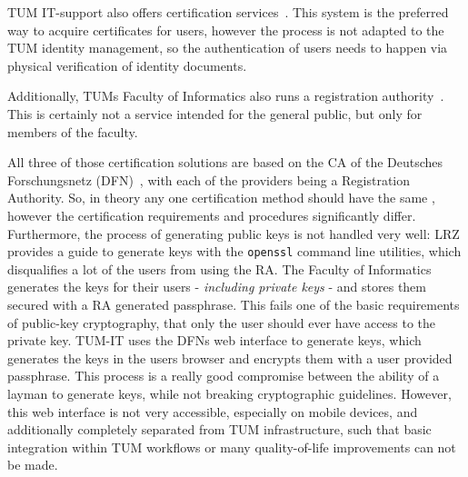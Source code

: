 TUM IT-support also offers certification services~\cite{tumZertifikat}.
This system is the preferred way to acquire certificates for users, however the process is not adapted to the TUM
identity management, so the authentication of users needs to happen via physical verification of identity documents.

Additionally, TUMs Faculty of Informatics also runs a registration authority~\cite{inTumCertificates}.
This is certainly not a service intended for the general public, but only for members of the faculty.

All three of those certification solutions are based on the CA of the Deutsches For\-schungs\-netz (DFN)~\cite{dfnPki},
with each of the providers being a Registration Authority.
So, in theory any one certification method should have the same , however the certification requirements and
procedures significantly differ.
Furthermore, the process of generating public keys is not handled very well: LRZ provides a guide to generate keys with
the \lstinline{openssl} command line utilities, which disqualifies a lot of the users from using the RA\@.
The Faculty of Informatics generates the keys for their users - \emph{including private keys} - and stores them secured
with a RA generated passphrase.
This fails one of the basic requirements of public-key cryptography, that only the user should ever have access to the
private key.
TUM-IT uses the DFNs web interface to generate keys, which generates the keys in the users browser and encrypts them
with a user provided passphrase.
This process is a really good compromise between the ability of a layman to generate keys, while not breaking
cryptographic guidelines.
However, this web interface is not very accessible, especially on mobile devices, and additionally completely separated
from TUM infrastructure, such that basic integration within TUM workflows or many quality-of-life improvements can not
be made.
